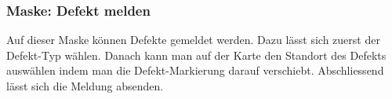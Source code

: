 \subsubsection{Maske: Defekt melden}
Auf dieser Maske können Defekte gemeldet werden. Dazu lässt sich zuerst der Defekt-Typ wählen. Danach kann man auf der Karte den Standort des Defekts auswählen indem man die Defekt-Markierung darauf verschiebt. Abschliessend lässt sich die Meldung absenden.

\begin{figure}[H]
\hfill
{}
\end{figure}

